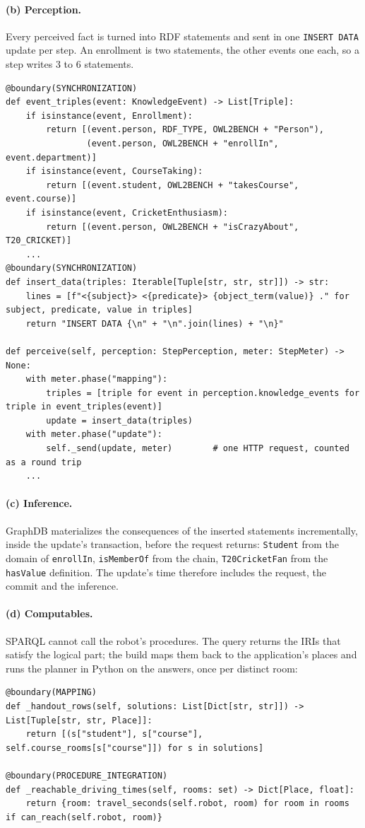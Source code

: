\documentclass[10pt]{article}
\newcommand{\brkunderscore}{\textunderscore\allowbreak}
\newcommand{\code}[1]{{\let\_\brkunderscore\texttt{#1}}}
\begin{document}
\paragraph{(b) Perception.} Every perceived fact is turned into RDF statements and sent in one \code{INSERT DATA} update
per step. An enrollment is two statements, the other events one each, so a step writes 3 to 6 statements.
\begin{lstlisting}[style=py]
@boundary(SYNCHRONIZATION)
def event_triples(event: KnowledgeEvent) -> List[Triple]:
    if isinstance(event, Enrollment):
        return [(event.person, RDF_TYPE, OWL2BENCH + "Person"),
                (event.person, OWL2BENCH + "enrollIn", event.department)]
    if isinstance(event, CourseTaking):
        return [(event.student, OWL2BENCH + "takesCourse", event.course)]
    if isinstance(event, CricketEnthusiasm):
        return [(event.person, OWL2BENCH + "isCrazyAbout", T20_CRICKET)]
    ...
@boundary(SYNCHRONIZATION)
def insert_data(triples: Iterable[Tuple[str, str, str]]) -> str:
    lines = [f"<{subject}> <{predicate}> {object_term(value)} ." for subject, predicate, value in triples]
    return "INSERT DATA {\n" + "\n".join(lines) + "\n}"

def perceive(self, perception: StepPerception, meter: StepMeter) -> None:
    with meter.phase("mapping"):
        triples = [triple for event in perception.knowledge_events for triple in event_triples(event)]
        update = insert_data(triples)
    with meter.phase("update"):
        self._send(update, meter)        # one HTTP request, counted as a round trip
    ...
\end{lstlisting}

\paragraph{(c) Inference.} GraphDB materializes the consequences of the inserted statements incrementally, inside the
update's transaction, before the request returns: \code{Student} from the domain of \code{enrollIn},
\code{isMemberOf} from the chain, \code{T20CricketFan} from the \code{hasValue} definition. The update's time therefore
includes the request, the commit and the inference.

\paragraph{(d) Computables.} SPARQL cannot call the robot's procedures. The query returns the IRIs that satisfy the
logical part; the build maps them back to the application's places and runs the planner in Python on the answers, once
per distinct room:
\begin{lstlisting}[style=py]
@boundary(MAPPING)
def _handout_rows(self, solutions: List[Dict[str, str]]) -> List[Tuple[str, str, Place]]:
    return [(s["student"], s["course"], self.course_rooms[s["course"]]) for s in solutions]

@boundary(PROCEDURE_INTEGRATION)
def _reachable_driving_times(self, rooms: set) -> Dict[Place, float]:
    return {room: travel_seconds(self.robot, room) for room in rooms if can_reach(self.robot, room)}
\end{lstlisting}
\end{document}

